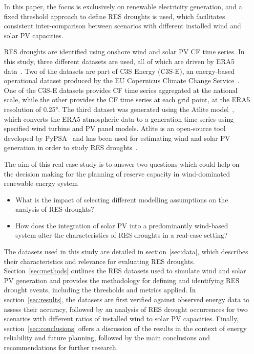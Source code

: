 \documentclass[preprint, 12pt]{elsarticle}
\begin{document}
In this paper, the focus is exclusively on renewable electricity generation, and a fixed threshold approach to define RES droughts is used, which facilitates consistent inter-comparison between scenarios with different installed wind and solar PV capacities.

RES droughts are identified using onshore wind and solar PV CF time series. In this study, three different datasets are used, all of which are driven by ERA5 data~\citep{hersbach2020era5}. Two of the datasets are part of C3S Energy (C3S-E), an energy-based operational dataset produced by the EU Copernicus Climate Change Service~\citep{dubus2023energy}. One of the C3S-E datasets provides CF time series aggregated at the national scale, while the other provides the CF time series at each grid point, at the ERA5 resolution of 0.25°. The third dataset was generated using the Atlite model~\citep{hofman2021atlite}, which converts the ERA5 atmospheric data to a generation time series using specified wind turbine and PV panel models. Atlite is an open-source tool developed by PyPSA~\citep{hofman2021atlite} and has been used for estimating wind and solar PV generation in order to study RES droughts~\citep{mockert2023drought}.

The aim of this real case study is to answer two questions which could help on the decision making for the planning of reserve capacity in wind-dominated renewable energy system 
\begin{itemize}
	\item What is the impact of selecting different modelling assumptions on the analysis of RES droughts?
	\item How does the integration of solar PV into a predominantly wind-based system alter the characteristics of RES droughts in a real-case setting?
\end{itemize}

The datasets used in this study are detailed in section~\ref{sec:data}, which describes their characteristics and relevance for evaluating RES droughts. Section~\ref{sec:methods} outlines the RES datasets used to simulate wind and solar PV generation and provides the methodology for defining and identifying RES drought events, including the thresholds and metrics applied. In section~\ref{sec:results}, the datasets are first verified against observed energy data to assess their accuracy, followed by an analysis of RES drought occurrences for two scenarios with different ratios of installed wind to solar PV capacities. Finally, section~\ref{sec:conclusions} offers a discussion of the results in the context of energy reliability and future planning, followed by the main conclusions and recommendations for further research.
\end{document}
